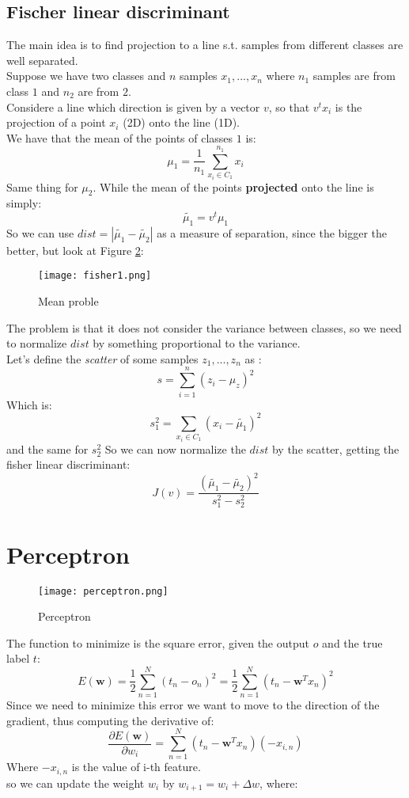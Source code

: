 \subsection{Fischer linear discriminant}
The main idea is to find projection to a line s.t. samples from different classes are well separated.\\
Suppose we have two classes and $n$ samples $x_1,...,x_n$ where $n_1$ samples are from class $1$ and $n_2$ are from $2$.\\
Considere a line which direction is given by a vector $v$, so that $v^tx_i$ is the projection of a point $x_i$ (2D) onto the line (1D).\\
We have that the mean of the points of classes $1$ is:
\[\mu_1=\frac{1}{n_1}\sum_{x_i \in C_1}^{n_1}x_i\]
Same thing for $\mu_2$. While the mean of the points \textbf{projected} onto the line is simply:
\[\tilde{\mu_1}=v^t\mu_1\]
So we can use $dist=|\tilde{\mu_1} -\tilde{\mu_2}|$ as a measure of separation, since the bigger the better, but look at Figure \ref{fig:fisher1}:

\begin{figure}[H]
\texttt{[image: fisher1.png]}
\caption{Mean proble}
\label{fig:fisher1}
\end{figure}

The problem is that it does not consider the variance between classes, so we need to normalize $dist$ by something proportional to the variance.\\
Let's define the \textit{scatter} of some samples $z_1,...,z_n$ as :
\[s=\sum_{i=1}^n(z_i-\mu_z)^2\]
Which is:
\[s_1^2=\sum_{x_i \in C_1}(x_i-\tilde{\mu_1})^2\]
and the same for $s_2^2$
So we can now normalize the $dist$ by the scatter, getting the fisher linear discriminant:
\[J(v)=\frac{(\tilde{\mu_1}-\tilde{\mu_2})^2}{s_1^2-s_2^2}\]

\section{Perceptron}

\begin{figure}[H]
\texttt{[image: perceptron.png]}
\caption{Perceptron}
\label{fig:fisher1}
\end{figure}

The function to minimize is the square error, given the output $o$ and the true label $t$:
\[E(\bm{w})=\frac{1}{2}\sum_{n=1}^N(t_n-o_n)^2=\frac{1}{2}\sum_{n=1}^N(t_n -\bm{w}^Tx_n)^2\]
Since we need to minimize this error we want to move to the direction of the gradient, thus computing the derivative of:
$$\frac{\partial E(\bm{w}) }{\partial w_i}=\sum_{n=1}^N(t_n-\bm{w}^Tx_n)(-x_{i,n})$$
Where $-x_{i,n}$ is the value of i-th feature.\\
so we can update the weight $w_i$ by $w_{i+1}=w_i + \Delta w$, where:

